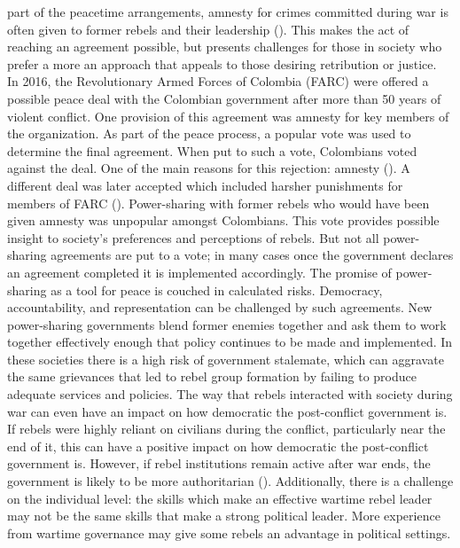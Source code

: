 \documentclass[11pt,]{article}
\begin{document}
part of the peacetime arrangements, amnesty for crimes committed during
war is often given to former rebels and their leadership
(\citet{jarstad_war_2008}). This makes the act of reaching an agreement
possible, but presents challenges for those in society who prefer a more
an approach that appeals to those desiring retribution or justice.\\
In 2016, the Revolutionary Armed Forces of Colombia (FARC) were offered
a possible peace deal with the Colombian government after more than 50
years of violent conflict. One provision of this agreement was amnesty
for key members of the organization. As part of the peace process, a
popular vote was used to determine the final agreement. When put to such
a vote, Colombians voted against the deal. One of the main reasons for
this rejection: amnesty (\citet{shifter_will_2016}). A different deal
was later accepted which included harsher punishments for members of
FARC (\citet{katkov_colombias_2016}). Power-sharing with former rebels
who would have been given amnesty was unpopular amongst Colombians. This
vote provides possible insight to society's preferences and perceptions
of rebels. But not all power-sharing agreements are put to a vote; in
many cases once the government declares an agreement completed it is
implemented accordingly. The promise of power-sharing as a tool for
peace is couched in calculated risks. Democracy, accountability, and
representation can be challenged by such agreements. New power-sharing
governments blend former enemies together and ask them to work together
effectively enough that policy continues to be made and implemented. In
these societies there is a high risk of government stalemate, which can
aggravate the same grievances that led to rebel group formation by
failing to produce adequate services and policies. The way that rebels
interacted with society during war can even have an impact on how
democratic the post-conflict government is. If rebels were highly
reliant on civilians during the conflict, particularly near the end of
it, this can have a positive impact on how democratic the post-conflict
government is. However, if rebel institutions remain active after war
ends, the government is likely to be more authoritarian
(\citet{huang_wartime_2016}). Additionally, there is a challenge on the
individual level: the skills which make an effective wartime rebel
leader may not be the same skills that make a strong political leader.
More experience from wartime governance may give some rebels an
advantage in political settings.
\end{document}
